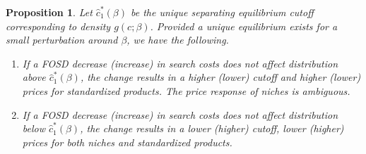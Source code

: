 \documentclass[14pt]{article}
\theoremstyle{plain}
\newtheorem{prop}[thm]{Proposition}
\theoremstyle{definition}
\theoremstyle{remark}
\DeclareRobustCommand\1{\futurelet\oneNext\oneCheck}
\begin{document}
\begin{prop}
Let $\hat{c}_1^*(\beta)$ be the unique separating equilibrium cutoff corresponding to density $g(c; \beta)$. Provided a unique equilibrium exists for a small perturbation around $\beta$, we have the following.
\begin{enumerate}
    \item[(i)] If a FOSD decrease (increase) in search costs does not affect distribution above $\hat{c}_1^*(\beta)$, the change results in a higher (lower) cutoff and higher (lower) prices for standardized products. The price response of niches is ambiguous.
    \item[(ii)] 
    If a FOSD decrease (increase) in search costs does not affect distribution below $\hat{c}_1^*(\beta)$, the change results in a lower (higher) cutoff, lower (higher) prices for both niches and standardized products.
\end{enumerate}
\end{prop}
\end{document}
